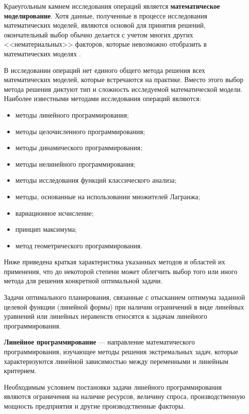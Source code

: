 Краеугольным камнем исследования операций является \textbf{математическое
моделирование}. Хотя данные, полученные в процессе исследования
математических моделей, являются основой для принятия решений,
окончательный выбор обычно делается с учетом многих других
<<нематериальных>> факторов, которые невозможно отобразить в
математических моделях \cite{taxa}.

В исследовании операций нет единого общего метода решения всех
математических моделей, которые встречаются на практике. Вместо этого
выбор метода решения диктуют тип и сложность исследуемой
математической модели.
Наиболее известными методами исследования операций являются:

\begin{itemize}
\setlength{\itemsep}{0.2ex}
\item методы линейного программирования;
\item методы целочисленного программирования;
\item методы динамического программирования;
\item методы нелинейного программирования;
\item методы исследования функций классического анализа;
\item методы, основанные на использовании множителей Лагранжа;
\item вариационное исчисление;
\item принцип максимума;
\item метод геометрического программирования.
\end{itemize}

Ниже приведена краткая характеристика указанных методов и областей их
применения, что до некоторой степени может облегчить выбор того или
иного метода для решения конкретной оптимальной задачи.

Задачи оптимального планирования, связанные с отысканием оптимума заданной
целевой функции (линейной формы) при наличии ограничений в виде
линейных уравнений или линейных неравенств относятся к задачам
линейного программирования.

\textbf{Линейное программирование} --- направление математического программирования,
изучающее методы решения экстремальных задач, которые характеризуются
линейной зависимостью между переменными и линейным критерием.

Необходимым условием постановки задачи линейного программирования
являются ограничения на наличие ресурсов, величину спроса,
производственную мощность предприятия и другие производственные
факторы.

